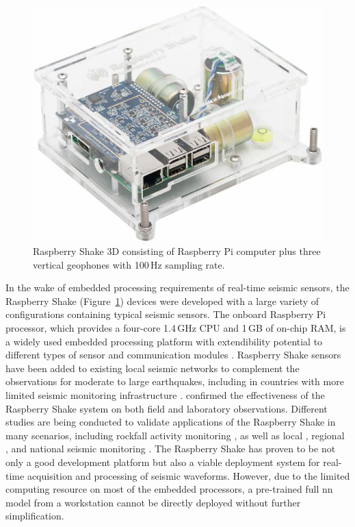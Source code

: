 \documentclass{article}
\begin{document}
%
\begin{figure}
    \centering
    \includegraphics[width=0.8\linewidth]{raspberry_shake}
    \caption{Raspberry Shake 3D consisting of Raspberry Pi computer plus three vertical geophones with 100\,Hz sampling rate.}
    \label{fig:raspberry_shake}
\end{figure}
%
In the wake of embedded processing requirements of real-time seismic sensors, the Raspberry Shake (Figure~\ref{fig:raspberry_shake}) devices were developed with a large variety of configurations containing typical seismic sensors.
The onboard Raspberry Pi processor, which provides a four-core 1.4\,GHz CPU and 1\,GB of on-chip RAM, is a widely used embedded processing platform with extendibility potential to different types of sensor and communication modules \autocite{upton2014raspberry}.
Raspberry Shake sensors have been added to existing local seismic networks to complement the observations for moderate to large earthquakes, including in countries with more limited seismic monitoring infrastructure \autocite{christensen2017raspberry}.
\textcite{anthony2018low} confirmed the effectiveness of the Raspberry Shake system on both field and laboratory observations.
Different studies are being conducted to validate applications of the Raspberry Shake in many scenarios, including rockfall activity monitoring \autocite{manconi2018evaluation}, as well as local \autocite{christensen2017raspberry}, regional \autocite{pulli2018seismic}, and national seismic monitoring \autocite{calais2019can}.
The Raspberry Shake has proven to be not only a good development platform but also a viable deployment system for real-time acquisition and processing of seismic waveforms.
However, due to the limited computing resource on most of the embedded processors, a pre-trained full \gls{nn} model from a workstation cannot be directly deployed without further simplification.
\end{document}
